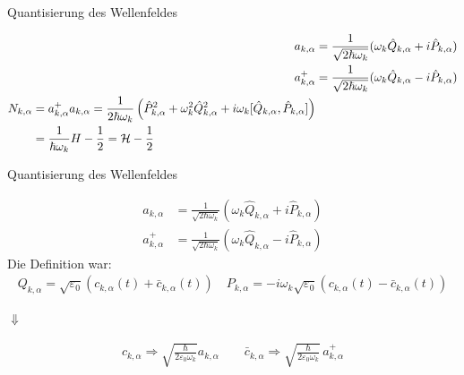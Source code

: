 \documentclass{beamer}
\begin{document}
\begin{frame}[t]{Quantisierung des Wellenfeldes}
	\vspace*{-0.5cm}
	\begin{center}
		\begin{minipage}{0.35\textwidth}
			\begin{align*}
			a_{k,\alpha} &= \frac{1}{\sqrt{2 \hbar \omega_k}} (\omega_k \hat{Q}_{k,\alpha} + i\hat{P}_{k,\alpha}) \\
			a^+_{k,\alpha} &= \frac{1}{\sqrt{2 \hbar \omega_k}} (\omega_k \hat{Q}_{k,\alpha} - i\hat{P}_{k,\alpha})\\
			\begin{split}
			N_{k,\alpha} &= a^+_{k,\alpha} a_{k,\alpha} = \frac{1}{2 \hbar \omega_k} \left(\hat{P}_{k,\alpha}^2 + \omega_k^2 \hat{Q}_{k,\alpha}^2 + i\omega_k [\hat{Q}_{k,\alpha},\hat{P}_{k,\alpha}] \right) \\
			&= \frac{1}{ \hbar \omega_k } H - \frac{1}{2} = {\cal H} - \frac{1}{2}
			\end{split}
			\end{align*}
		\end{minipage}
	\end{center}
\end{frame}

\begin{frame}[t]{Quantisierung des Wellenfeldes}
	\vspace*{-0.5cm}
	\begin{center}
		\begin{minipage}{0.35\textwidth}
			\begin{align*}
				a_{k,\alpha} &= \frac{1}{\sqrt{2 \hbar \omega_k}} (\omega_k \hat{Q}_{k,\alpha} + i\hat{P}_{k,\alpha}) \\
				a^+_{k,\alpha} &= \frac{1}{\sqrt{2 \hbar \omega_k}} (\omega_k \hat{Q}_{k,\alpha} - i\hat{P}_{k,\alpha})
			\end{align*}
			Die Definition war:
			\begin{align*}
				Q_{k,\alpha} = \sqrt{\varepsilon_0} \left(c_{k,\alpha}(t) + \bar{c}_{k,\alpha}(t)\right) \quad P_{k,\alpha} = -i \omega_k \sqrt{\varepsilon_0} \left(c_{k,\alpha}(t) - \bar{c}_{k,\alpha}(t)\right) 
			\end{align*}
		\end{minipage}
		
		\vspace*{0.5cm}
		$\Downarrow$
		
		\begin{minipage}{0.35\textwidth}
			\begin{align*}
			 c_{k,\alpha} \Rightarrow \sqrt{\frac{\hbar}{2 \varepsilon_0 \omega_k}} a_{k,\alpha} \qquad 
			 \bar{c}_{k,\alpha} \Rightarrow \sqrt{\frac{\hbar}{2 \varepsilon_0 \omega_k}} \, a^+_{k,\alpha}
			\end{align*}
		\end{minipage}
	\end{center}
\end{frame}
\end{document}
